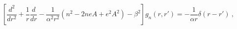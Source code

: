\begin{equation}
\left[\frac{d^2}{dr^2}+\frac{1}{r}\frac d{dr}-\frac1{\alpha^2r^2}(n^2-2neA+
e^2A^2)-\beta^2 \right]g_{n}(r,r')=-\frac1{\alpha r}\delta(r-r') \ ,
\label{12}
\end{equation}

